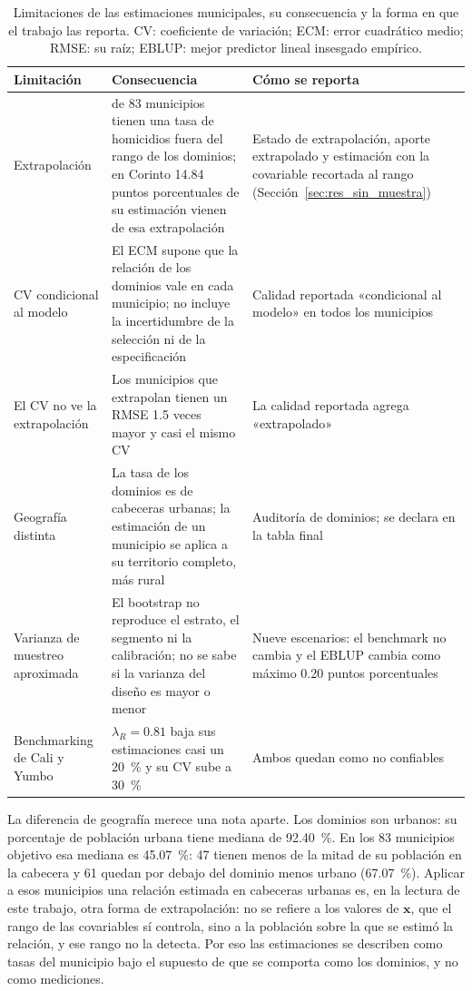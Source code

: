 \begin{table}[!htbp]
\centering
\small
\caption{Limitaciones de las estimaciones municipales, su consecuencia y la forma en que el trabajo las reporta. CV: coeficiente de variación; ECM: error cuadrático medio; RMSE: su raíz; EBLUP: mejor predictor lineal insesgado empírico.}
\label{tab:dis_alcance}
\begin{tabularx}{\linewidth}{>{\raggedright\arraybackslash}p{3.2cm} >{\raggedright\arraybackslash}X >{\raggedright\arraybackslash}X}
\toprule
Limitación & Consecuencia & Cómo se reporta \\
\midrule
Extrapolación & 21 de 83 municipios tienen una tasa de homicidios fuera del rango de los dominios; en Corinto 14.84 puntos porcentuales de su estimación vienen de esa extrapolación & Estado de extrapolación, aporte extrapolado y estimación con la covariable recortada al rango (Sección~\ref{sec:res_sin_muestra}) \\
CV condicional al modelo & El ECM supone que la relación de los dominios vale en cada municipio; no incluye la incertidumbre de la selección ni de la especificación & Calidad reportada «condicional al modelo» en todos los municipios \\
El CV no ve la extrapolación & Los municipios que extrapolan tienen un RMSE 1.5 veces mayor y casi el mismo CV & La calidad reportada agrega «extrapolado» \\
Geografía distinta & La tasa de los dominios es de cabeceras urbanas; la estimación de un municipio se aplica a su territorio completo, más rural & Auditoría de dominios; se declara en la tabla final \\
Varianza de muestreo aproximada & El bootstrap no reproduce el estrato, el segmento ni la calibración; no se sabe si la varianza del diseño es mayor o menor & Nueve escenarios: el benchmark no cambia y el EBLUP cambia como máximo 0.20 puntos porcentuales \\
Benchmarking de Cali y Yumbo & $\lambda_R = 0.81$ baja sus estimaciones casi un 20~\% y su CV sube a 30~\% & Ambos quedan como no confiables \\
\bottomrule
\end{tabularx}
\end{table}

La diferencia de geografía merece una nota aparte. Los dominios son urbanos: su porcentaje de población urbana tiene mediana de 92.40~\%. En los 83 municipios objetivo esa mediana es 45.07~\%: 47 tienen menos de la mitad de su población en la cabecera y 61 quedan por debajo del dominio menos urbano (67.07~\%). Aplicar a esos municipios una relación estimada en cabeceras urbanas es, en la lectura de este trabajo, otra forma de extrapolación: no se refiere a los valores de $\mathbf{x}$, que el rango de las covariables sí controla, sino a la población sobre la que se estimó la relación, y ese rango no la detecta. Por eso las estimaciones se describen como tasas del municipio bajo el supuesto de que se comporta como los dominios, y no como mediciones.

